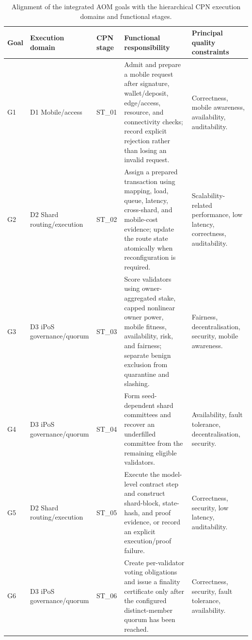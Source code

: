 \documentclass[a4paper,fleqn]{cas-sc}
\begin{document}
\begin{table}[pos=t]
\centering
\caption{Alignment of the integrated AOM goals with the hierarchical CPN
execution domains and functional stages.}
\label{tab:goal_hierarchy}
\scriptsize
\setlength{\tabcolsep}{3.5pt}
\renewcommand{\arraystretch}{1.10}
\begin{tabularx}{\textwidth}{p{0.7cm}p{2.6cm}p{2.6cm}X p{3.2cm}}
\toprule
\textbf{Goal} & \textbf{Execution domain} & \textbf{CPN stage} &
\textbf{Functional responsibility} & \textbf{Principal quality constraints}\\
\midrule
G1 & D1 Mobile/access & ST\_01 &
Admit and prepare a mobile request after signature, wallet/deposit,
edge/access, resource, and connectivity checks; record explicit rejection
rather than losing an invalid request. &
Correctness, mobile awareness, availability, auditability.\\

G2 & D2 Shard routing/execution & ST\_02 &
Assign a prepared transaction using mapping, load, queue, latency,
cross-shard, and mobile-cost evidence; update the route state atomically when
reconfiguration is required. &
Scalability-related performance, low latency, correctness, auditability.\\

G3 & D3 iPoS governance/quorum & ST\_03 &
Score validators using owner-aggregated stake, capped nonlinear owner power,
mobile fitness, availability, risk, and fairness; separate benign exclusion
from quarantine and slashing. &
Fairness, decentralisation, security, mobile awareness.\\

G4 & D3 iPoS governance/quorum & ST\_04 &
Form seed-dependent shard committees and recover an underfilled committee from
the remaining eligible validators. &
Availability, fault tolerance, decentralisation, security.\\

G5 & D2 Shard routing/execution & ST\_05 &
Execute the model-level contract step and construct shard-block, state-hash,
and proof evidence, or record an explicit execution/proof failure. &
Correctness, security, low latency, auditability.\\

G6 & D3 iPoS governance/quorum & ST\_06 &
Create per-validator voting obligations and issue a finality certificate only
after the configured distinct-member quorum has been reached. &
Correctness, security, fault tolerance, availability.\\


\end{tabularx}
\end{table}
\end{document}
